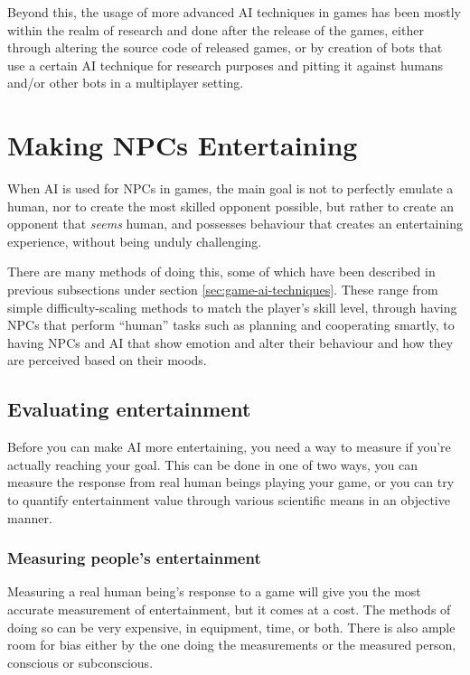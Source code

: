 \documentclass[]{report}
\begin{document}
Beyond this, the usage of more advanced AI techniques in games has been mostly
within the realm of research and done after the release of the games, either
through altering the source code of released games, or by creation of bots that
use a certain AI technique for research purposes and pitting it against humans
and/or other bots in a multiplayer setting.


\chapter{Making NPCs Entertaining}
\label{cha:npc-entert-value}

When AI is used for NPCs in games, the main goal is not to perfectly emulate a
human, nor to create the most skilled opponent possible, but rather to create an
opponent that \emph{seems} human, and possesses behaviour that creates an
entertaining experience, without being unduly challenging.

There are many methods of doing this, some of which have been described in
previous subsections under section \ref{sec:game-ai-techniques}. These range
from simple difficulty-scaling methods to match the player's skill level,
through having NPCs that perform ``human'' tasks such as planning and
cooperating smartly, to having NPCs and AI that show emotion and alter their
behaviour and how they are perceived based on their moods.

\section{Evaluating entertainment}
\label{sec:eval-entert}

Before you can make AI more entertaining, you need a way to measure if you're
actually reaching your goal. This can be done in one of two ways, you can
measure the response from real human beings playing your game, or you can try to
quantify entertainment value through various scientific means in an objective
manner.

\subsection{Measuring people's entertainment}
\label{sec:measuring-people}

Measuring a real human being's response to a game will give you the most
accurate measurement of entertainment, but it comes at a cost. The methods of
doing so can be very expensive, in equipment, time, or both. There is also ample
room for bias either by the one doing the measurements or the measured person,
conscious or subconscious.
\end{document}
